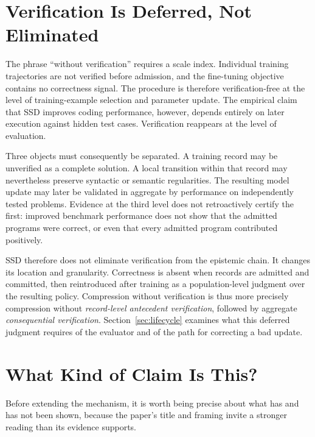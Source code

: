 \documentclass[11pt]{article}
\begin{document}
\section{Verification Is Deferred, Not Eliminated}

The phrase ``without verification'' requires a scale index. Individual training trajectories are not verified before admission, and the fine-tuning objective contains no correctness signal. The procedure is therefore verification-free at the level of training-example selection and parameter update. The empirical claim that SSD improves coding performance, however, depends entirely on later execution against hidden test cases. Verification reappears at the level of evaluation.

Three objects must consequently be separated. A training record may be unverified as a complete solution. A local transition within that record may nevertheless preserve syntactic or semantic regularities. The resulting model update may later be validated in aggregate by performance on independently tested problems. Evidence at the third level does not retroactively certify the first: improved benchmark performance does not show that the admitted programs were correct, or even that every admitted program contributed positively.

SSD therefore does not eliminate verification from the epistemic chain. It changes its location and granularity. Correctness is absent when records are admitted and committed, then reintroduced after training as a population-level judgment over the resulting policy. Compression without verification is thus more precisely compression without \emph{record-level antecedent verification}, followed by aggregate \emph{consequential verification}. Section~\ref{sec:lifecycle} examines what this deferred judgment requires of the evaluator and of the path for correcting a bad update.

\section{What Kind of Claim Is This?}

Before extending the mechanism, it is worth being precise about what has and has not been shown, because the paper's title and framing invite a stronger reading than its evidence supports.
\end{document}
